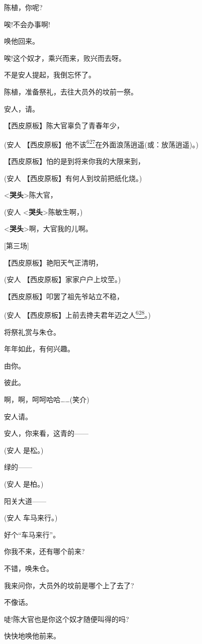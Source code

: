 陈植，你呢?

唉!不会办事啊!

唤他回来。

唉!这个奴才，乘兴而来，败兴而去呀。

不是安人提起，我倒忘怀了。

陈植，准备祭礼，去往大员外的坟前一祭。

安人，请。

【西皮原板】陈大官辜负了青春年少，

(安人
【西皮原板】他不该\protect\hyperlink{fn627}{\textsuperscript{627}}在外面浪荡逍遥(或：放荡逍遥)。)

【西皮原板】怕的是到将来你我的大限来到，

(安人 【西皮原板】有何人到坟前把纸化烧。)

\textless{}\textbf{哭头}\textgreater{}陈大官，

(安人 \textless{}\textbf{哭头}\textgreater{}陈敏生啊，)

\textless{}\textbf{哭头}\textgreater{}啊，大官我的儿啊。

{[}第三场{]}

【西皮原板】艳阳天气正清明，

(安人 【西皮原板】家家户户上坟茔。)

【西皮原板】叩罢了祖先爷站立不稳，

(安人
【西皮原板】上前去搀夫君年迈之人\protect\hyperlink{fn628}{\textsuperscript{628}}。)

将祭礼赏与朱仓。

年年如此，有何兴趣。

由你。

彼此。

啊，啊，呵呵哈哈\ldots{}\ldots{}(笑介)

安人请。

安人，你来看，这青的------

(安人 是松。)

绿的------

(安人 是柏。)

阳关大道------

(安人 车马来行。)

好个``车马来行''。

你我不来，还有哪个前来?

不错，唤朱仓。

我来问你，大员外的坟前是哪个上了去了?

不像话。

唗!陈大官也是你这个奴才随便叫得的吗?

快快地唤他前来。

